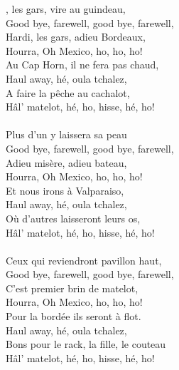 
, les gars, vire au guindeau,
\\Good bye, farewell, good bye, farewell,
\\Hardi, les gars, adieu Bordeaux,
\\Hourra, Oh Mexico, ho, ho, ho!
\\Au Cap Horn, il ne fera pas chaud,
\\Haul away, hé, oula tchalez,
\\A faire la pêche au cachalot,
\\Hâl’ matelot, hé, ho, hisse, hé, ho!
\\\\Plus d’un y laissera sa peau
\\Good bye, farewell, good bye, farewell,
\\Adieu misère, adieu bateau,
\\Hourra, Oh Mexico, ho, ho, ho!
\\Et nous irons à Valparaiso,
\\Haul away, hé, oula tchalez,
\\Où d’autres laisseront leurs os,
\\Hâl’ matelot, hé, ho, hisse, hé, ho!
\\\\Ceux qui reviendront pavillon haut,
\\Good bye, farewell, good bye, farewell,
\\C’est premier brin de matelot,
\\Hourra, Oh Mexico, ho, ho, ho!
\\Pour la bordée ils seront à flot.
\\Haul away, hé, oula tchalez,
\\Bons pour le rack, la fille, le couteau
\\Hâl’ matelot, hé, ho, hisse, hé, ho! 
\breakpage
